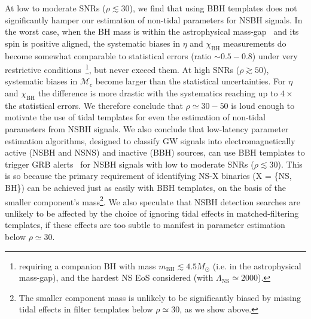 \documentclass[aps,prd,amsmath,floats,floatfix, twocolumn,
superscriptaddress,nofootinbib,showpacs]{revtex4-1}
\newcommand{\lambdans}{\Lambda_\mathrm{NS}}
\newcommand{\chibh}{\chi_\mathrm{BH}}
\newcommand{\mbh}{m_\mathrm{BH}}
\newcommand{\mns}{m_\mathrm{NS}}
\newcommand{\mchirp}{\mathcal{M}_c}
\begin{document}
At low to moderate SNRs ($\rho\lesssim 30$), we find that using BBH templates
does not significantly hamper our estimation of non-tidal parameters for NSBH
signals. In the worst case, when the BH mass is within the astrophysical 
mass-gap~\cite{Bailyn:1997xt,Kalogera:1996ci,Kreidberg:2012,Littenberg:2015tpa}
and its spin is positive aligned, the systematic biases in $\eta$ and $\chibh$
measurements do become somewhat comparable to statistical errors (ratio
$\sim 0.5-0.8$) under very restrictive conditions~\footnote{requiring a
companion BH with mass $\mbh\lesssim 4.5M_\odot$ (i.e. in the astrophysical
mass-gap), and the
hardest NS EoS considered (with $\lambdans\simeq 2000$).}, but never exceed them.
At high SNRs ($\rho\gtrsim 50$), systematic biases in $\mchirp$ become larger
than the statistical uncertainties. For $\eta$ and $\chibh$ the difference
is more drastic with the systematics reaching up to $4\times$ the statistical
errors. We therefore conclude that $\rho\simeq 30-50$ is loud enough to
motivate the use of tidal templates for even the estimation of non-tidal
parameters from NSBH signals.
% 
We also conclude that low-latency parameter estimation algorithms, designed to
classify GW signals into electromagnetically active (NSBH and NSNS) and
inactive (BBH) sources, can use BBH templates to trigger GRB 
alerts~\cite{2012A&A...541A.155A,Singer:2014qca,Singer:2015ema,Pankow:2015cra,
Abbott:2016wya,Abbott:2016gcq} for NSBH signals with low to moderate SNRs
($\rho\lesssim 30$).
This is so because the primary requirement of identifying NS-X binaries (X =
\{NS, BH\}) can be achieved just as easily with BBH templates, on the basis of
the smaller component's mass\footnote{The smaller component mass is unlikely
to be significantly biased by missing tidal effects in filter templates below
$\rho\simeq 30$, as we show above.}.
% 
We also speculate that NSBH detection searches are unlikely to be
affected by the choice of ignoring tidal effects in matched-filtering
templates, if these effects are too subtle to manifest in parameter estimation
below $\rho\simeq 30$.



% 
\end{document}

